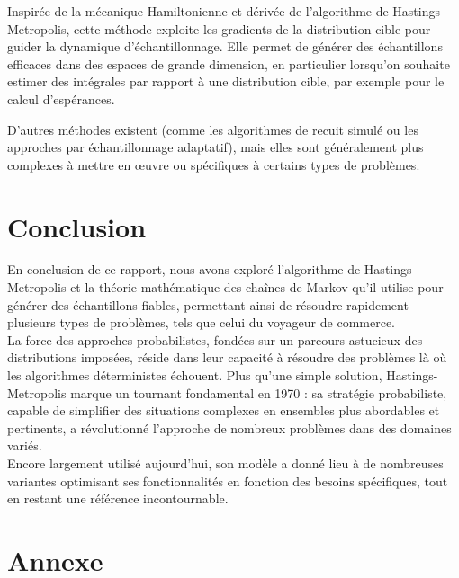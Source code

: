 \documentclass{article}
\begin{document}
\begin{tcolorbox}[colback=white,colframe=yellow!80!black,title=Le Monte Carlo Hamiltonien (HMC)]
Inspirée de la mécanique Hamiltonienne et dérivée de l'algorithme de Hastings-Metropolis, cette méthode exploite les gradients de la distribution cible pour guider la dynamique d'échantillonnage. Elle permet de générer des échantillons efficaces dans des espaces de grande dimension, en particulier lorsqu'on souhaite estimer des intégrales par rapport à une distribution cible, par exemple pour le calcul d'espérances.
\end{tcolorbox}

D'autres méthodes existent (comme les algorithmes de recuit simulé ou les approches par échantillonnage adaptatif), 
mais elles sont généralement plus complexes à mettre en œuvre ou spécifiques à certains types de problèmes.

\newpage %
\section{Conclusion}

En conclusion de ce rapport, nous avons exploré l'algorithme de Hastings-Metropolis et la théorie mathématique des chaînes de Markov qu'il utilise pour générer des échantillons fiables,
permettant ainsi de résoudre rapidement plusieurs types de problèmes, tels que celui du voyageur de commerce. \\

La force des approches probabilistes, fondées sur un parcours astucieux des distributions imposées, réside dans leur capacité à résoudre des problèmes là où les algorithmes déterministes échouent.
Plus qu'une simple solution, Hastings-Metropolis marque un tournant fondamental en 1970 : sa stratégie probabiliste, capable de simplifier des situations complexes en ensembles plus abordables et pertinents, a révolutionné l'approche de nombreux problèmes dans des domaines variés. \\

Encore largement utilisé aujourd'hui, son modèle a donné lieu à de nombreuses variantes optimisant ses fonctionnalités en fonction des besoins spécifiques, tout en restant une référence incontournable. \\

\newpage
\section{Annexe}
\end{document}
